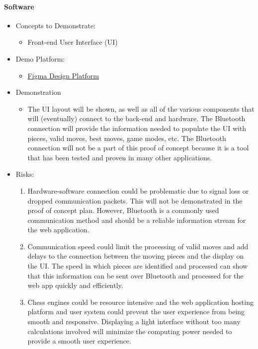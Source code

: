 \documentclass{article}
\begin{document}
\paragraph{Software}
\begin{itemize}
    \item Concepts to Demonstrate:
    \begin{itemize}
        \item Front-end User Interface (UI)
    \end{itemize}
    \item Demo Platform:
    \begin{itemize}
        \item \href{https://www.figma.com/}{Figma Design Platform}
    \end{itemize}
    \item Demonstration
    \begin{itemize}
        \item The UI layout will be shown, as well as all of the various components that will (eventually) connect to the back-end and hardware. The Bluetooth connection will provide the information needed to populate the UI with pieces, valid moves, best moves, game modes, etc. The Bluetooth connection will not be a part of this proof of concept because it is a tool that has been tested and proven in many other applications. 
    \end{itemize}
    \item Risks:
    \begin{enumerate}
        \item Hardware-software connection could be problematic due to signal loss or dropped communication packets. This will not be demonstrated in the proof of concept plan. However, Bluetooth is a commonly used communication method and should be a reliable information stream for the web application.
        \item Communication speed could limit the processing of valid moves and add delays to the connection between the moving pieces and the display on the UI. The speed in which pieces are identified and processed can show that this information can be sent over Bluetooth and processed for the web app quickly and efficiently.
        \item Chess engines could be resource intensive and the web application hosting platform and user system could prevent the user experience from being smooth and responsive. Displaying a light interface without too many calculations involved will minimize the computing power needed to provide a smooth user experience.
    \end{enumerate}
\end{itemize}
\end{document}
